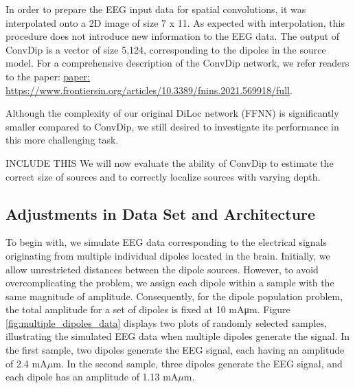 \documentclass[a4paper, UKenglish, 11pt]{uiomaster}
\begin{document}
In order to prepare the EEG input data for spatial convolutions, it was interpolated onto a 2D image of size 7 x 11. As expected with interpolation, this procedure does not introduce new information to the EEG data. The output of ConvDip is a vector of size 5,124, corresponding to the dipoles in the source model. For a comprehensive description of the ConvDip network, we refer readers to the paper: \href{https://www.frontiersin.org/articles/10.3389/fnins.2021.569918/full}{paper: https://www.frontiersin.org/articles/10.3389/fnins.2021.569918/full}.

Although the complexity of our original DiLoc network (FFNN) is significantly smaller compared to ConvDip, we still desired to investigate its performance in this more challenging task.

INCLUDE THIS
We will now evaluate the ability of ConvDip to estimate the correct size of sources and to correctly localize sources with varying depth.


\subsection{Adjustments in Data Set and Architecture}

To begin with, we simulate EEG data corresponding to the electrical signals originating from multiple individual dipoles located in the brain. Initially, we allow unrestricted distances between the dipole sources. However, to avoid overcomplicating the problem, we assign each dipole within a sample with the same magnitude of amplitude. Consequently, for the dipole population problem, the total amplitude for a set of dipoles is fixed at 10 mAμm. Figure \ref{fig:multiple_dipoles_data} displays two plots of randomly selected samples, illustrating the simulated EEG data when multiple dipoles generate the signal. In the first sample, two dipoles generate the EEG signal, each having an amplitude of 2.4 mA$\mu$m. In the second sample, three dipoles generate the EEG signal, and each dipole has an amplitude of 1.13 mA$\mu$m.
\end{document}
